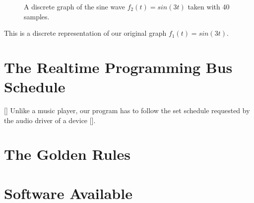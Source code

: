 \begin{figure}[h] %
	\begin{center}
		\caption{A discrete graph of the sine wave \(f_2(t) = sin(3t)\) taken with 40 samples.}
	\end{center}
\end{figure}

This is a discrete representation of our original graph \(f_1(t) = sin(3t)\).

\section{The Realtime Programming Bus Schedule}
[] Unlike a music player, our program has to follow the set schedule requested by the audio driver of a device [].
\section{The Golden Rules}
\section{Software Available}
